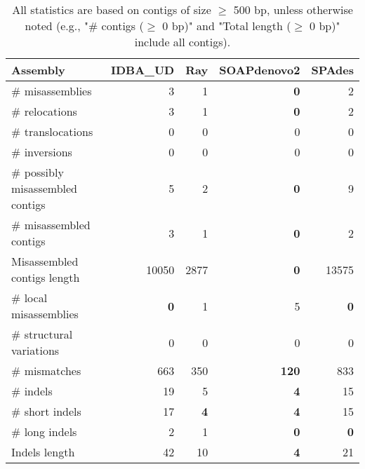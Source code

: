 \documentclass[12pt,a4paper]{article}
\begin{document}
\begin{table}[ht]
\begin{center}
\caption{All statistics are based on contigs of size $\geq$ 500 bp, unless otherwise noted (e.g., "\# contigs ($\geq$ 0 bp)" and "Total length ($\geq$ 0 bp)" include all contigs).}
\begin{tabular}{|l*{4}{|r}|}
\hline
Assembly & IDBA\_UD & Ray & SOAPdenovo2 & SPAdes \\ \hline
\# misassemblies & 3 & 1 & {\bf 0} & 2 \\ \hline
\hspace{5mm}\# relocations & 3 & 1 & {\bf 0} & 2 \\ \hline
\hspace{5mm}\# translocations & 0 & 0 & 0 & 0 \\ \hline
\hspace{5mm}\# inversions & 0 & 0 & 0 & 0 \\ \hline
\# possibly misassembled contigs & 5 & 2 & {\bf 0} & 9 \\ \hline
\# misassembled contigs & 3 & 1 & {\bf 0} & 2 \\ \hline
Misassembled contigs length & 10050 & 2877 & {\bf 0} & 13575 \\ \hline
\# local misassemblies & {\bf 0} & 1 & 5 & {\bf 0} \\ \hline
\# structural variations & 0 & 0 & 0 & 0 \\ \hline
\# mismatches & 663 & 350 & {\bf 120} & 833 \\ \hline
\# indels & 19 & 5 & {\bf 4} & 15 \\ \hline
\hspace{5mm}\# short indels & 17 & {\bf 4} & {\bf 4} & 15 \\ \hline
\hspace{5mm}\# long indels & 2 & 1 & {\bf 0} & {\bf 0} \\ \hline
Indels length & 42 & 10 & {\bf 4} & 21 \\ \hline
\end{tabular}
\end{center}
\end{table}
\end{document}
